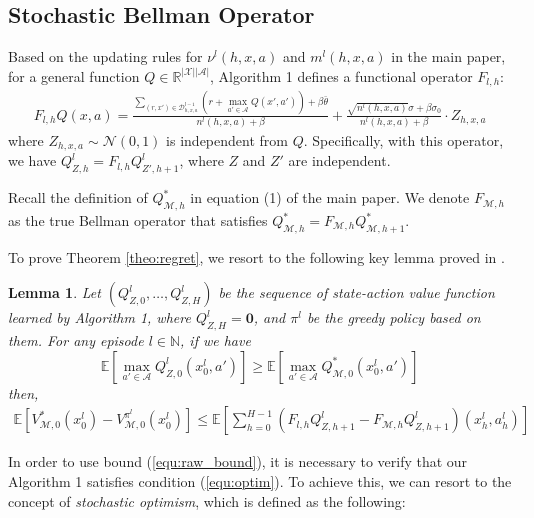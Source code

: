 \documentclass[letterpaper]{article} %
\newcommand{\Sp}[1]{\left(#1\right)}
\newcommand{\Mp}[1]{\left[#1\right]}
\newcommand{\abs}[1]{\left|#1\right|}
\newcommand{\ve}[1]{\mathbf{#1}}
\newcommand{\E}{\mathbb{E}}
\newcommand{\R}{\mathbb{R}}
\newcommand{\M}{\mathcal{M}}
\newtheorem{lemma}{Lemma}
\theoremstyle{definition}
\begin{document}
\subsection{Stochastic Bellman Operator}
Based on the updating rules for $\nu^l\Sp{h, x, a}$ and $m^l\Sp{h, x, a}$ in the main paper, for a general function $Q\in\R^{\abs{\mathcal{X}}\abs{\mathcal{A}}}$, Algorithm 1 defines a functional operator $F_{l, h}$:
\begin{equation}
\label{equ:operator}
    \begin{split}
        F_{l, h}Q\Sp{x, a}=\frac{\sum_{\Sp{r, x'}\in\mathcal{D}^{l-1}_{h, x, a}}\Sp{r+\max_{a'\in\mathcal{A}}Q\Sp{x', a'}}+\beta\bar{\theta}}{n^l\Sp{h, x, a}+\beta}+ \frac{\sqrt{n^l\Sp{h, x, a}}\sigma+\beta\sigma_0}{n^l\Sp{h, x, a}+\beta}\cdot Z_{h, x, a}
    \end{split}
\end{equation}
where $Z_{h, x, a}\sim\mathcal{N}\Sp{0, 1}$ is independent from $Q$. Specifically, with this operator, we have $Q_{Z, h}^l=F_{l, h}Q_{Z', h+1}^l$, where $Z$ and $Z'$ are independent.

Recall the definition of $Q^*_{\M, h}$ in equation (1) of the main paper. We denote $F_{\M, h}$ as the true Bellman operator that satisfies $Q^*_{\M, h}=F_{\M, h}Q^*_{\M, h+1}$.

To prove Theorem \ref{theo:regret}, we resort to the following key lemma proved in \cite{osband2017deep}. 
\begin{lemma}
	\label{lemma:sto_optim}
	Let $\Sp{Q^l_{Z, 0}, \dots, Q^l_{Z, H}}$ be the sequence of state-action value function learned by Algorithm 1, where $Q^l_{Z, H}=\ve{0}$, and $\pi^l$ be the greedy policy based on them. For any episode $l\in\mathbb{N}$, if we have
	\begin{equation}
	\label{equ:optim}
	\E\Mp{\max_{a'\in\mathcal{A}}Q^l_{Z, 0}\Sp{x^l_0, a'}}\geq\E\Mp{\max_{a'\in\mathcal{A}}Q^*_{\M, 0}\Sp{x^l_0, a'}}
	\end{equation}
	then,
    \begin{equation}
    \label{equ:raw_bound}
        \begin{split}
            \E\Mp{V^*_{\M, 0}\Sp{x_0^l}-V^{\pi^l}_{\M, 0}\Sp{x_0^l}}\leq\E\Mp{\sum_{h=0}^{H-1}\Sp{F_{l, h}Q^l_{Z, h+1}-F_{\M, h}Q^l_{Z, h+1}}\Sp{x_h^l, a_h^l}}
        \end{split}
    \end{equation}
\end{lemma}

In order to use bound (\ref{equ:raw_bound}), it is necessary to verify that our Algorithm 1 satisfies condition (\ref{equ:optim}). To achieve this, we can resort to the concept of \textit{stochastic optimism}, which is defined as the following:
\end{document}
